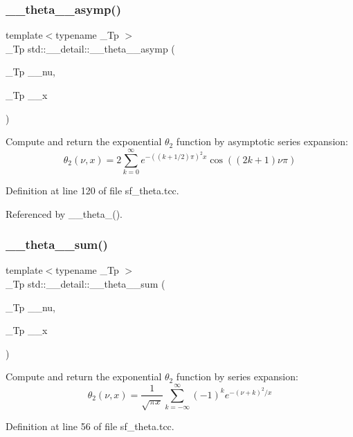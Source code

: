 \subsubsection{\texorpdfstring{\+\_\+\+\_\+theta\+\_\+\_\+asymp()}{\_\_theta\_2\_asymp()}}
{\footnotesize\ttfamily template$<$typename \+\_\+\+Tp $>$ \\
\+\_\+\+Tp std\+::\+\_\+\+\_\+detail\+::\+\_\+\+\_\+theta\+\_\+\_\+asymp (\begin{DoxyParamCaption}\item[{\+\_\+\+Tp}]{\+\_\+\+\_\+nu,  }\item[{\+\_\+\+Tp}]{\+\_\+\+\_\+x }\end{DoxyParamCaption})}

Compute and return the exponential $ \theta_2 $ function by asymptotic series expansion\+: \[ \theta_2(\nu, x) = 2\sum_{k=0}^{\infty} e^{-((k+1/2)\pi)^2 x} \cos((2k+1)\nu\pi) \] 

Definition at line 120 of file sf\+\_\+theta.\+tcc.



Referenced by \+\_\+\+\_\+theta\+\_().

\mbox{\label{namespacestd_1_1____detail_af434f6a07d92577f40f352aa3d44483c}} 
\subsubsection{\texorpdfstring{\+\_\+\+\_\+theta\+\_\+\_\+sum()}{\_\_theta\_2\_sum()}}
{\footnotesize\ttfamily template$<$typename \+\_\+\+Tp $>$ \\
\+\_\+\+Tp std\+::\+\_\+\+\_\+detail\+::\+\_\+\+\_\+theta\+\_\+\_\+sum (\begin{DoxyParamCaption}\item[{\+\_\+\+Tp}]{\+\_\+\+\_\+nu,  }\item[{\+\_\+\+Tp}]{\+\_\+\+\_\+x }\end{DoxyParamCaption})}

Compute and return the exponential $ \theta_2 $ function by series expansion\+: \[ \theta_2(\nu, x) = \frac{1}{\sqrt{\pi x}} \sum_{k=-\infty}^{\infty}(-1)^k e^{-(\nu+k)^2/x} \] 

Definition at line 56 of file sf\+\_\+theta.\+tcc.



